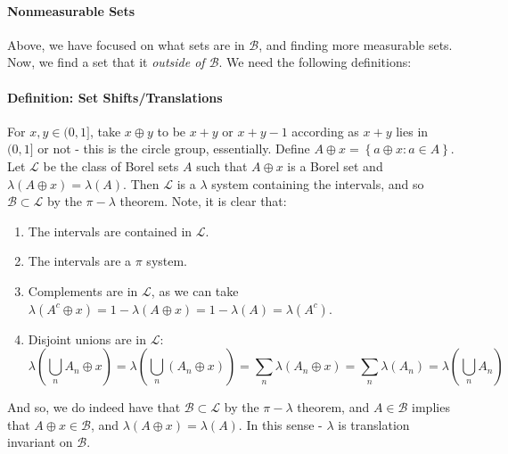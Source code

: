 \documentclass[12pt,a4paper]{article}
\newcommand{\1}[1]{\mathbbm{1}\left\{ #1 \right\}}
\newcommand{\lcal}{\mathcal{L}}
\newcommand{\bcal}{\mathcal{B}}
\begin{document}
\paragraph{Nonmeasurable Sets} Above, we have focused on what sets are in $\bcal$, and finding more measurable sets. Now, we find a set that it \textit{outside of $\bcal$}. We need the following definitions:

\paragraph{Definition: Set Shifts/Translations} For $x,y \in (0,1]$, take $x \oplus y$ to be $x + y$ or $x + y - 1$ according as $x + y$ lies in $(0,1]$ or not - this is the circle group, essentially. Define $A \oplus x = \left\{a \oplus x: a \in A\right\}$. Let $\lcal$ be the class of Borel sets $A$ such that $A \oplus x$ is a Borel set and $\lambda(A \oplus x) = \lambda(A)$. Then $\lcal$ is a $\lambda$ system containing the intervals, and so $\bcal \subset \lcal$ by the $\pi-\lambda$ theorem. Note, it is clear that:
\begin{enumerate}
	\item The intervals are contained in $\lcal$.
	\item The intervals are a $\pi$ system.
	\item Complements are in $\lcal$, as we can take $\lambda(A^c \oplus x) = 1 - \lambda(A \oplus x) = 1 - \lambda(A) = \lambda(A^c)$.
	\item Disjoint unions are in $\lcal$:
	$$
		\lambda\left(\bigcup_n A_n \oplus x\right) =
		\lambda\left(\bigcup_n (A_n \oplus x)\right) =
		\sum_n \lambda(A_n \oplus x) = 
		\sum_n \lambda(A_n) =
		\lambda\left(\bigcup_n A_n\right)
	$$
\end{enumerate}
And so, we do indeed have that $\bcal \subset \lcal$ by the $\pi-\lambda$ theorem, and $A \in \bcal$ implies that $A \oplus x \in \bcal$, and $\lambda(A \oplus x) = \lambda(A)$. In this sense - $\lambda$ is translation invariant on $\bcal$.
\end{document}
